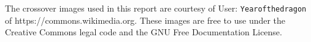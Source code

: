 \appendices
\section{}
	The crossover images used in this report are courtesy of User: \texttt{Yearofthedragon} of https://commons.wikimedia.org. These images are free to use under the Creative Commons legal code and the GNU Free Documentation License.